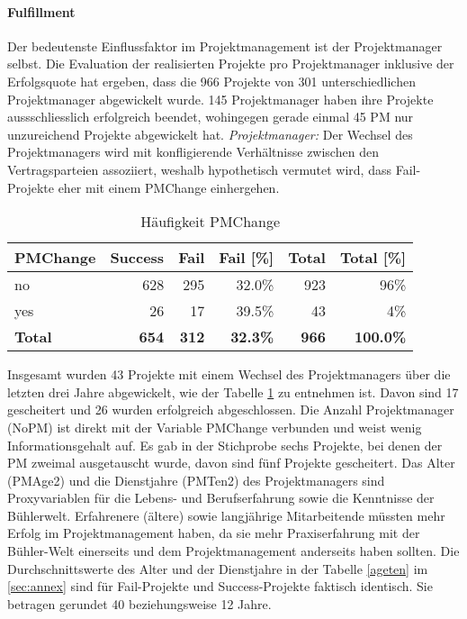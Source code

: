 \paragraph{Fulfillment} Der bedeutenste Einflussfaktor im Projektmanagement ist der Projektmanager selbst. Die Evaluation der realisierten Projekte pro Projektmanager inklusive der Erfolgsquote hat ergeben, dass die 966 Projekte von 301 unterschiedlichen Projektmanager abgewickelt wurde. 145 Projektmanager haben ihre Projekte aussschliesslich erfolgreich beendet, wohingegen gerade einmal 45 PM nur unzureichend Projekte abgewickelt hat.
%
%
\newline\newline\textit{Projektmanager:} Der Wechsel des Projektmanagers wird mit konfligierende Verhältnisse zwischen den Vertragsparteien assoziiert, weshalb hypothetisch vermutet wird, dass Fail-Projekte eher mit einem PMChange einhergehen. 
\begin{table}[H]
	\centering
	\caption{Häufigkeit PMChange}
	\begin{tabular}{lrrrrr}
		\textbf{PMChange} & \multicolumn{1}{l}{\textbf{Success}} & \multicolumn{1}{l}{\textbf{Fail}} & \multicolumn{1}{l}{\textbf{Fail [\%]}} & \multicolumn{1}{l}{\textbf{Total}} &
		\multicolumn{1}{l}{\textbf{Total [\%]}} \\\hline
		no    & 628   & 295   & 32.0\% & 923 & 96\% \\
		yes   & 26    & 17    & 39.5\% & 43  & 4\% \\\hline
		\textbf{Total} & \textbf{654} & \textbf{312} & \textbf{32.3\%} & \textbf{966} & \textbf{100.0\%} \\
	\end{tabular}%
	\label{pmchange}%
\end{table}%
Insgesamt wurden 43 Projekte mit einem Wechsel des Projektmanagers über die letzten drei Jahre abgewickelt, wie der Tabelle \ref{pmchange} zu entnehmen ist. Davon sind 17 gescheitert und 26 wurden erfolgreich abgeschlossen. Die Anzahl Projektmanager (NoPM) ist direkt mit der Variable PMChange verbunden und weist wenig Informationsgehalt auf. Es gab in der Stichprobe sechs Projekte, bei denen der PM zweimal ausgetauscht wurde, davon sind fünf Projekte gescheitert.
%
%
\newline Das Alter (PMAge2) und die Dienstjahre (PMTen2) des Projektmanagers sind Proxyvariablen für die Lebens- und Berufserfahrung sowie die Kenntnisse der Bühlerwelt. Erfahrenere (ältere) sowie langjährige Mitarbeitende müssten mehr Erfolg im Projektmanagement haben, da sie mehr Praxiserfahrung mit der Bühler-Welt einerseits und dem Projektmanagement anderseits haben sollten. Die Durchschnittswerte des Alter und der Dienstjahre in der Tabelle \ref{ageten} im \ref{sec:annex} sind für Fail-Projekte und Success-Projekte faktisch identisch. Sie betragen gerundet 40 beziehungsweise 12 Jahre.
